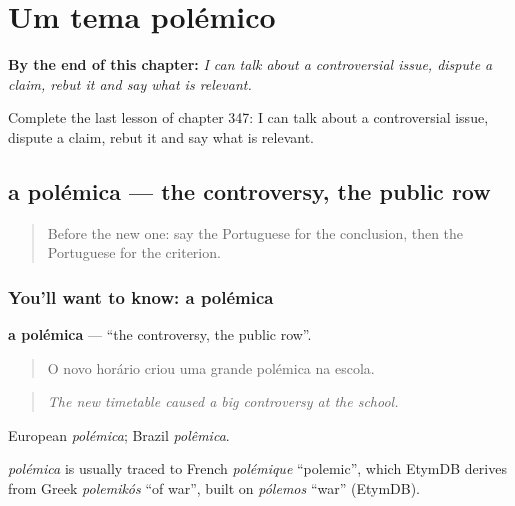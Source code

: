 
\chapter{Um tema polémico}
\label{ch:pt-um-tema-polemico}

\begin{chapteropening}
\textbf{By the end of this chapter:} \emph{I can talk about a controversial issue, dispute a claim, rebut it and say what is relevant.}

Complete the last lesson of chapter 347: I can talk about a controversial issue, dispute a claim, rebut it and say what is relevant.
\end{chapteropening}

\section[a polémica]{a polémica — the controversy, the public row}

\label{lesson:PT-C347-polemica}



\begin{quote}
Before the new one: say the Portuguese for the conclusion, then the Portuguese for the criterion.
\end{quote}

\subsection*{You'll want to know: a polémica}
\textbf{a polémica} — \textquotedblleft{}the controversy, the public row\textquotedblright{}.

\begin{quote}
O novo horário criou uma grande polémica na escola.
\end{quote}

\begin{quote}
\emph{The new timetable caused a big controversy at the school.}
\end{quote}

European \emph{polémica}; Brazil \emph{polêmica}.

\begin{cousinweb}
\emph{polémica} is usually traced to French \emph{polémique} \textquotedblleft{}polemic\textquotedblright{}, which EtymDB derives from Greek \emph{polemikós} \textquotedblleft{}of war\textquotedblright{}, built on \emph{pólemos} \textquotedblleft{}war\textquotedblright{} (EtymDB).
\end{cousinweb}

